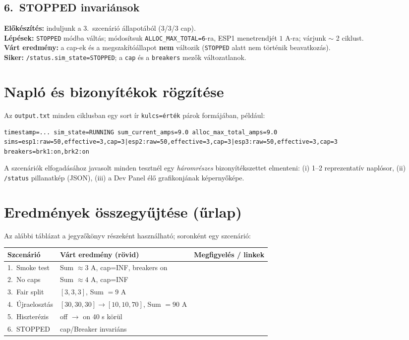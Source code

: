 \subsection{6.\ STOPPED invariánsok}
\textbf{Előkészítés:} induljunk a 3.\ szcenárió állapotából (3/3/3 cap).\\
\textbf{Lépések:} \texttt{STOPPED} módba váltás; módosítsuk \texttt{ALLOC\_MAX\_TOTAL=6}-ra, ESP1 menetrendjét \(1\) A-ra; várjunk \(\sim\) 2 ciklust.\\
\textbf{Várt eredmény:} a cap-ek és a megszakítóállapot \textbf{nem} változik (\texttt{STOPPED} alatt nem történik beavatkozás).\\
\textbf{Siker:} \texttt{/status.sim\_state=STOPPED}; a \texttt{cap} és a \texttt{breakers} mezők változatlanok.

\section{Napló és bizonyítékok rögzítése}
Az \texttt{output.txt} minden ciklusban egy sort ír \texttt{kulcs=érték} párok formájában, például:
\begin{verbatim}
timestamp=... sim_state=RUNNING sum_current_amps=9.0 alloc_max_total_amps=9.0
sims=esp1:raw=50,effective=3,cap=3|esp2:raw=50,effective=3,cap=3|esp3:raw=50,effective=3,cap=3
breakers=brk1:on,brk2:on
\end{verbatim}
A szcenáriók elfogadásához javasolt minden tesztnél egy \emph{háromrészes} bizonyítékszettet elmenteni: (i) 1--2 reprezentatív naplósor, (ii) \texttt{/status} pillanatkép (JSON), (iii) a Dev Panel élő grafikonjának képernyőképe.

\section{Eredmények összegyűjtése (űrlap)}
Az alábbi táblázat a jegyzőkönyv részeként használható; soronként egy szcenárió:
\begin{center}
\begin{tabular}{p{3.2cm} p{5.6cm} p{5.6cm}}
\hline
\textbf{Szcenárió} & \textbf{Várt eredmény (rövid)} & \textbf{Megfigyelés / linkek} \\
\hline
1.\ Smoke test & Sum \(\approx 3\) A, cap=INF, breakers on & \\
2.\ No caps & Sum \(\approx 4\) A, cap=INF & \\
3.\ Fair split & \([3,3,3]\), Sum \(=9\) A & \\
4.\ Újraelosztás & \([30,30,30] \to [10,10,70]\), Sum \(=90\) A & \\
5.\ Hiszterézis & off \( \to \) on 40 s körül & \\
6.\ STOPPED & cap/Breaker invariáns & \\
\hline
\end{tabular}
\end{center}

